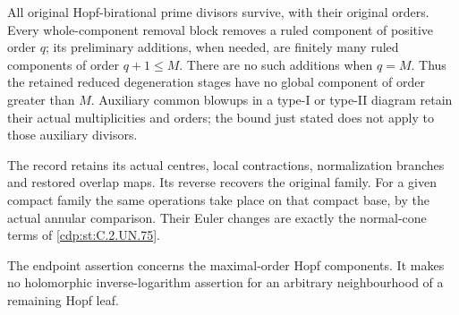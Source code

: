 \begin{proposition}
All original Hopf-birational prime divisors survive, with
their original orders.  Every whole-component removal block
removes a ruled component of positive order \(q\);
its preliminary additions, when needed, are finitely many
ruled components of order \(q+1\le M\).  There are no such
additions when \(q=M\).  Thus the retained reduced degeneration stages have
no global component of order greater than \(M\).
Auxiliary common blowups in a type-I or type-II diagram
retain their actual multiplicities and orders; the bound
just stated does not apply to those auxiliary divisors.

The record retains its actual centres, local contractions,
normalization branches and restored overlap maps.  Its
reverse recovers the original family.  For a given compact
family the same operations take place on that compact
base, by the actual annular comparison.  Their Euler
changes are exactly the normal-cone terms of \ref{cdp:st:C.2.UN.75}.

The endpoint assertion concerns the maximal-order Hopf
components.  It makes no holomorphic inverse-logarithm
assertion for an arbitrary neighbourhood of a remaining
Hopf leaf.
\end{proposition}

